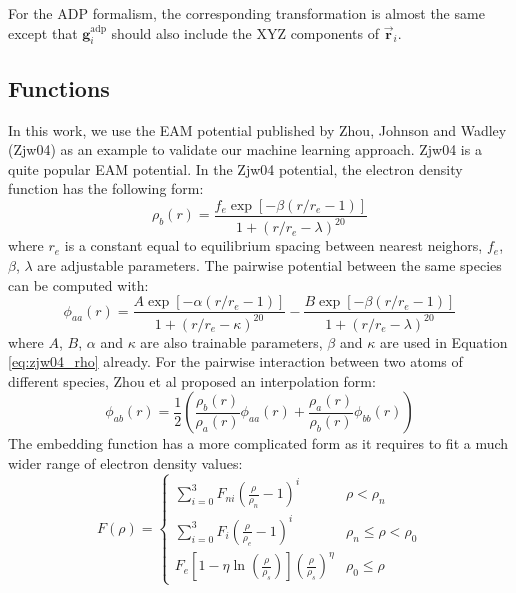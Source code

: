 \documentclass[prb,reprint]{revtex4-2}
\begin{document}
For the ADP formalism, the corresponding transformation is almost the same 
except that $\mathbf{g}_{i}^{\mathrm{adp}}$ should also include the XYZ 
components of $\vec{\mathbf{r}}_i$.

\subsection{Functions}
\label{sec:functions}

In this work, we use the EAM potential published by Zhou, Johnson and Wadley 
(Zjw04) \cite{ZJW0,ZJW1,ZJW2} as an example to validate our machine learning 
approach. Zjw04 is a quite popular EAM potential. In the Zjw04 potential, the 
electron density function has the following form:
\begin{equation}
\label{eq:zjw04_rho}
\rho_{b}(r) = \frac{
    f_{e} \exp\left[ -\beta\left( r/r_{e} - 1 \right) \right]
}{
    1 + \left(r/r_{e} - \lambda\right)^{20}
}
\end{equation}
where $r_e$ is a constant equal to equilibrium spacing between nearest neighors, 
$f_{e}$, $\beta$, $\lambda$ are adjustable parameters. The pairwise potential 
between the same species can be computed with:
\begin{equation}
\label{eq:zjw04_phi_aa}
\phi_{aa}(r) = 
\frac{A \exp\left[ -\alpha\left( r/r_{e} - 1 \right) \right]}
     {1 + \left(r / r_{e} - \kappa\right)^{20}} - 
\frac{B \exp\left[ -\beta\left( r/r_{e} - 1 \right) \right]}
     {1 + \left(r / r_{e} - \lambda\right)^{20}}
\end{equation}
where $A$, $B$, $\alpha$ and $\kappa$ are also trainable parameters, $\beta$ and 
$\kappa$ are used in Equation \ref{eq:zjw04_rho} already. For the pairwise 
interaction between two atoms of different species, Zhou et al proposed an 
interpolation form:
\begin{equation}
\label{eq:zjw04_phi_ab}
\phi_{ab}(r) = \frac{1}{2}\left(
    \frac{\rho_{b}(r)}{\rho_{a}(r)}\phi_{aa}(r) +
    \frac{\rho_{a}(r)}{\rho_{b}(r)}\phi_{bb}(r) 
\right)
\end{equation}
The embedding function has a more complicated form as it requires to fit a much 
wider range of electron density values:
\begin{equation}
\label{eq:zjw04_embed}
F(\rho) = \begin{cases}
    \sum_{i=0}^{3}{F_{ni}\left( \frac{\rho}{\rho_n} - 1 \right)^{i}} &
    \rho < \rho_{n} \\
    \sum_{i=0}^{3}{F_{i}\left( \frac{\rho}{\rho_e} - 1 \right)^{i}} &
    \rho_{n} \leq \rho < \rho_{0} \\
    F_{e}\left[ 
        1 - \eta\ln\left( \frac{\rho}{\rho_s}\right) 
    \right](\frac{\rho}{\rho_s})^{\eta} & \rho_{0} \leq \rho
\end{cases}
\end{equation}
\end{document}
